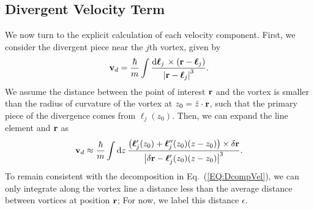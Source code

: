 \documentclass[onecolumn,nofootinbib,superscriptaddress]{revtex4}
\newcommand{\dd}[1]{\mathrm{d}#1\,}
\newcommand{\bfell}{\boldsymbol \ell}
\begin{document}
\subsection{Divergent Velocity Term}

We now turn to the explicit calculation of each velocity component.  First, we consider the divergent piece near the $j$th vortex, given by
\begin{equation}
{\bf v}_d = \frac{\hbar}{m}\int \frac{\dd{\bfell_j}\times\left({\bf r} - \bfell_j\right)}{\left|{\bf r} - \bfell_j\right|^3}.
\end{equation}
We assume the distance between the point of interest ${\bf r}$ and the vortex is smaller than the radius of curvature of the vortex at $z_0 = \hat{z}\cdot{\bf r}$, such that the primary piece of the divergence comes from ${\boldsymbol \ell}_j(z_0)$.  Then, we can expand the line element and ${\bf r}$ as
\begin{equation}
{\bf v}_d \approx \frac{\hbar}{m}\int \dd{z}\frac{\left(\bfell'_j(z_0) + \bfell''_j(z_0)(z-z_0)\right)\times\delta{\bf r}}{\left|\delta{\bf r} - \bfell'_j(z_0)(z-z_0)\right|^3}.
\end{equation}
To remain consistent with the decomposition in Eq.~(\ref{EQ:DcompVel}), we can only integrate along the vortex line a distance less than the average distance between vortices at position ${\bf r}$; For now, we label this distance $\epsilon$.
\end{document}
